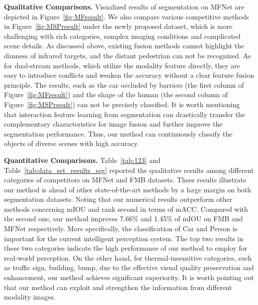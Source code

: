 \documentclass[10pt,twocolumn,letterpaper]{article}
\begin{document}
\noindent\textbf{Qualitative Comparisons.} 
Visualized results of segmentation on MFNet are depicted in Figure~\ref{fig:MFresult}.   We also compare various competitive methods in Figure~\ref{fig:MSPresult} under the newly proposed dataset, which is more challenging with rich categories, complex imaging conditions and complicated scene details.
As discussed above, existing fusion methods cannot highlight the dimness of infrared targets, and the distant pedestrian can not be recognized.
As for dual-stream methods, which utilize the modality feature directly, they are easy to introduce conflicts and weaken the accuracy without a clear feature fusion principle. The results, such as the car occluded by barriers (the first column of Figure~\ref{fig:MFresult})  and the shape of the human (the second column of Figure~\ref{fig:MSPresult}) can not be precisely classified.
It is worth mentioning that interaction feature learning from segmentation can drastically transfer  the complementary  characteristics for image fusion and further improve the segmentation performance.  Thus, our method can continuously classify the objects of diverse scenes with high accuracy.

\noindent\textbf{Quantitative Comparisons.} 
Table~\ref{tab:123} and Table~\ref{tab:data_set_results_seg} reported the qualitative results among different categories of competitors on MFNet and FMB datasets. These results illustrate our method is ahead of other state-of-the-art methods by a large margin on both segmentation datasets. Noting that our numerical results outperform other methods concerning mIOU and rank second in terms of mACC. Compared with the second one, our method improves 7.66\% and 1.45\% of mIOU on FMB and MFNet respectively. More specifically, the classification of Car and Person is important for the current intelligent perception system. The top two results in these two categories indicate the high performance of our method to employ for real-world perception. On the other hand, for thermal-insensitive categories, such as traffic sign, building, bump, due to the effective visual quality preservation and enhancement, our method achieves significant superiority.  It is worth pointing out that our method can exploit and strengthen the information from different modality images. 
\end{document}

